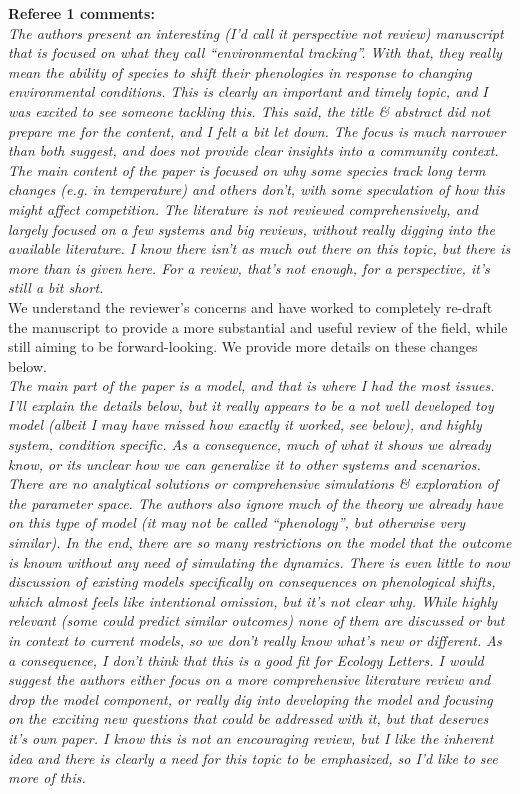 \documentclass[11pt]{article}
\begin{document}
{\bf Referee 1 comments:} \\

\emph{The authors present an interesting (I'd call it perspective not review) manuscript that is
focused on what they call ``environmental tracking''. With that, they really mean the ability
of species to shift their phenologies in response to changing environmental conditions. This
is clearly an important and timely topic, and I was excited to see someone tackling this.
This said, the title \& abstract did not prepare me for the content, and I felt a bit let
down. The focus is much narrower than both suggest, and does not provide clear insights into
a community context. The main content of the paper is focused on why some species track long
term changes (e.g. in temperature) and others don't, with some speculation of how this might
affect competition. The literature is not reviewed comprehensively, and largely focused on a
few systems and big reviews, without really digging into the available literature. I know
there isn't as much out there on this topic, but there is more than is given here. For a
review, that's not enough, for a perspective, it's still a bit short. }\\

We understand the reviewer's concerns and have worked to completely re-draft the manuscript to provide a more substantial and useful review of the field, while still aiming to be forward-looking. We provide more details on these changes below. \\

\emph{The main part of the
paper is a model, and that is where I had the most issues. I'll explain the details below,
but it really appears to be a not well developed toy model (albeit I may have missed how
exactly it worked, see below), and highly system, condition specific. As a consequence, much
of what it shows we already know, or its unclear how we can generalize it to other systems
and scenarios. There are no analytical solutions or comprehensive simulations \& exploration
of the parameter space. The authors also ignore much of the theory we already have on this
type of model (it may not be called ``phenology'', but otherwise very similar). In the end,
there are so many restrictions on the model that the outcome is known without any need of
simulating the dynamics. There is even little to now discussion of existing models
specifically on consequences on phenological shifts, which almost feels like intentional
omission, but it's not clear why. While highly relevant (some could predict similar outcomes)
none of them are discussed or but in context to current models, so we don't really know
what's new or different. As a consequence, I don't think that this is a good fit for Ecology
Letters. I would suggest the authors either focus on a more comprehensive literature review
and drop the model component, or really dig into developing the model and focusing on the
exciting new questions that could be addressed with it, but that deserves it's own paper. I
know this is not an encouraging review, but I like the inherent idea and there is clearly a
need for this topic to be emphasized, so I'd like to see more of this.}\\
\end{document}
